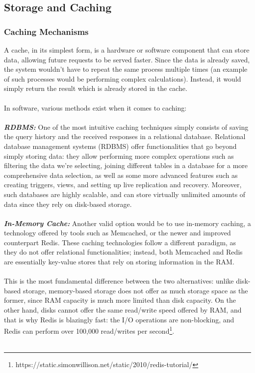 \subsection{Storage and Caching}
\subsubsection{Caching Mechanisms}
A cache, in its simplest form, is a hardware or software component that can store data, allowing future requests to be served faster. Since the data is already saved, the system wouldn't have to repeat the same process multiple times (an example of such processes would be performing complex calculations). Instead, it would simply return the result which is already stored in the cache.\\\\
In software, various methods exist when it comes to caching:\\\\
\textbf{\textit{RDBMS:}} One of the most intuitive caching techniques simply consists of saving the query history and the received responses in a relational database. Relational database management systems (RDBMS) offer functionalities that go beyond simply storing data: they allow performing more complex operations such as filtering the data we're selecting, joining different tables in a database for a more comprehensive data selection, as well as some more advanced features such as creating triggers, views, and setting up live replication and recovery. Moreover, such databases are highly scalable, and can store virtually unlimited amounts of data since they rely on disk-based storage.\\\\
\textbf{\textit{In-Memory Cache:}} Another valid option would be to use in-memory caching, a technology offered by tools such as Memcached, or the newer and improved counterpart Redis. These caching technologies follow a different paradigm, as they do not offer relational functionalities; instead, both Memcached and Redis are essentially key-value stores that rely on storing information in the RAM.\\\\
This is the most fundamental difference between the two alternatives: unlike disk-based storage, memory-based storage does not offer as much storage space as the former, since RAM capacity is much more limited than disk capacity. On the other hand, disks cannot offer the same read/write speed offered by RAM, and that is why Redis is blazingly fast: the I/O operations are non-blocking, and Redis can perform over 100,000 read/writes per second\footnote{https://static.simonwillison.net/static/2010/redis-tutorial/}.\\\\
